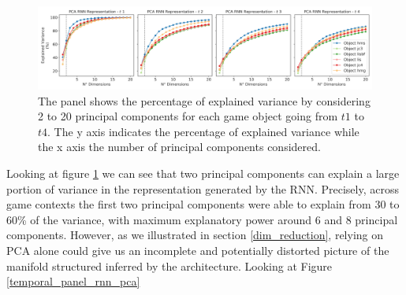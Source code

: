 \begin{figure}[h]
\centering
\includegraphics[width=\textwidth]{images/chapter_4/pca_embedding.png}
\caption[\textbf{Principal component analysis of the hidden units activation of the RNN architecture }]{The panel shows the percentage of explained variance by considering 2 to 20 principal components for each game object going from $t1$ to $t4$. The y axis indicates the percentage of explained variance while the x axis the number of principal components considered.}
\label{pca_emb} 
\end{figure}

Looking at figure \ref{pca_emb} we can see that two principal components can explain a large portion of variance in the representation generated by the RNN. Precisely, across game contexts the first two principal components were able to explain from 30 to 60\% of the variance, with maximum explanatory power around 6 and 8 principal components. However, as we illustrated in section \ref{dim_reduction}, relying on PCA alone could give us an incomplete and potentially distorted picture of the manifold structured inferred by the architecture. Looking at Figure \ref{temporal_panel_rnn_pca} 

